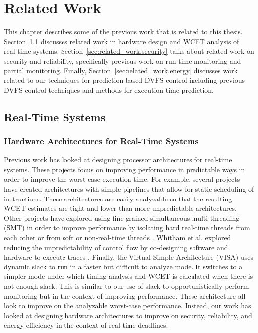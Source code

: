 \chapter{Related Work}
\label{chap:related_work}

This chapter describes some of the previous work that is related to this
thesis. Section~\ref{sec:related_work.realtime} discusses related work in
hardware design and WCET analysis of real-time systems.
Section~\ref{sec:related_work.security} talks about related work on security and
reliability, specifically previous work on run-time monitoring and partial
monitoring. Finally, Section~\ref{sec:related_work.energy} discusses work
related to our techniques for prediction-based DVFS control including previous
DVFS control techniques and methods for execution time prediction.

\section{Real-Time Systems}
\label{sec:related_work.realtime}

\subsection{Hardware Architectures for Real-Time Systems}

Previous work has looked at designing processor architectures for real-time
systems. These projects focus on improving performance in predictable ways in
order to improve the worst-case execution time. For example, several projects
\cite{spear-ecrts03, mcgrep-rtss06, jop-jsa07, patmos-ppes2011}
have created architectures with simple pipelines that allow for static
scheduling of instructions. These architectures are easily analyzable so that the
resulting WCET estimates are tight and lower than more unpredictable architectures. Other projects
have explored using fine-grained simultaneous multi-threading (SMT) in order to
improve performance by isolating hard real-time threads from each other
\cite{pret-dac07, pret-cases08, ptarm-iccd12} or from soft or non-real-time
threads \cite{merasa-micro10, carcores-arcs10, flexpret-rtas14}. Whitham et al.
explored reducing the unpredictability of control flow by co-designing software
and hardware to execute traces \cite{whitham-comp10}. Finally, the Virtual
Simple Architecture (VISA) \cite{visa-isca03, multi_task_visa-rtss04} uses
dynamic slack to run in a faster but difficult to analyze mode. It switches to
a simpler mode under which timing analysis and WCET is calculated when there is
not enough slack. This is similar to our use of slack to opportunistically
perform monitoring but in the context of improving performance.
These architecture all look to improve on the analyzable worst-case
performance. Instead, our work has looked at designing hardware architectures
to improve on security, reliability, and energy-efficiency in the context of
real-time deadlines.

